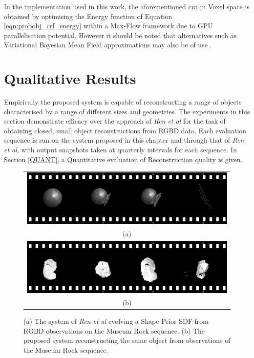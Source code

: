 In the implementation used in this work, the aforementioned cut in Voxel space
is obtained by optimising the Energy function of Equation
\ref{eqn:probobj_crf_energy} within a Max-Flow framework \cite{BOYKOV} due to GPU
parallelisation potential. However it should be noted that alternatives such as
Variational Bayesian Mean Field approximations may also be of use \cite{KRAHENBUHL}.

\section{Qualitative Results}
Empirically the proposed system is capable of reconstructing a range of objects 
characterised by a range of different sizes and geometries. The experiments in 
this section demonstrate efficacy over the approach of \textit{Ren et al} 
\cite{Ren2013} for the task of obtaining closed, small object reconstructions 
from RGBD data. Each evaluation sequence is run on the system proposed in this 
chapter and through that of \textit{Ren et al}, with output snapshots taken at 
quarterly intervals for each sequence. In Section \ref{QUANT}, a Quantitative 
evaluation of Reconstruction quality is given.

\begin{figure}[ht]
  \label{fig:probobj_rock_s3d}
  \centering
  \begin{tabular}{@{}c@{}}
    \includegraphics[width=.6\linewidth]{figures/object_recon/strips/rock_s3d.png} \\
    (a) \\
    \includegraphics[width=.6\linewidth]{figures/object_recon/strips/rock.png} \\ 
    (b)\\
  \end{tabular}
  \caption[Probabilistic Object Reconstruction Qualitative Results I]
  {(a) The system of \textit{Ren et al} \cite{Ren2013} evolving a Shape Prior SDF 
  from RGBD observations on the Museum Rock sequence. (b) The proposed system reconstructing 
  the same object from observations of the Museum Rock sequence.}
\end{figure}

